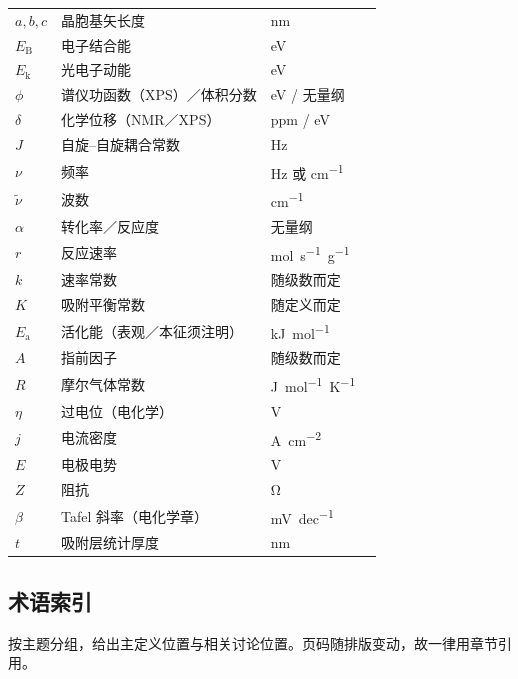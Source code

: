 {\begin{xltabular}{\textwidth}{@{}p{22mm}p{60mm}X p{17mm}@{}}
$a,b,c$ & 晶胞基矢长度 & \unit{nm} &  \\
$E_{\mathrm{B}}$ & 电子结合能 & \unit{eV} &  \\
$E_{\mathrm{k}}$ & 光电子动能 & \unit{eV} &  \\
$\phi$ & 谱仪功函数（XPS）／体积分数 & \unit{eV} / 无量纲 &  \\
$\delta$ & 化学位移（NMR／XPS） & \unit{ppm} / \unit{eV} &  \\
$J$ & 自旋--自旋耦合常数 & \unit{Hz} &  \\
$\nu$ & 频率 & \unit{Hz} 或 \unit{cm^{-1}} &  \\
$\tilde{\nu}$ & 波数 & \unit{cm^{-1}} &  \\
$\alpha$ & 转化率／反应度 & 无量纲 &  \\
$r$ & 反应速率 & \unit{mol.s^{-1}.g^{-1}} &  \\
$k$ & 速率常数 & 随级数而定 &  \\
$K$ & 吸附平衡常数 & 随定义而定 &  \\
$E_{\mathrm{a}}$ & 活化能（表观／本征须注明） & \unit{kJ.mol^{-1}} &  \\
$A$ & 指前因子 & 随级数而定 &  \\
$R$ & 摩尔气体常数 & \unit{J.mol^{-1}.K^{-1}} &  \\
$\eta$ & 过电位（电化学） & \unit{V} &  \\
$j$ & 电流密度 & \unit{A.cm^{-2}} &  \\
$E$ & 电极电势 & \unit{V} &  \\
$Z$ & 阻抗 & \unit{\ohm} &  \\
$\beta$ & Tafel 斜率（电化学章） & \unit{mV.dec^{-1}} &  \\
$t$ & 吸附层统计厚度 & \unit{nm} &  \\
\end{xltabular}}

\widepageson

\subsection{术语索引}

按主题分组，给出主定义位置与相关讨论位置。页码随排版变动，故一律用章节引用。

